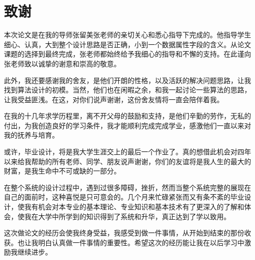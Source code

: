 \section*{致谢}
本次论文是在我的导师张留美张老师的亲切关心和悉心指导下完成的。他指导学生细心、认真，大到整个设计思路是否正确，小到一个数据属性字段的含义。从论文课题的选择到最终完成，张老师都始终给予我细心的指导和不懈的支持。在此谨向张老师致以诚挚的谢意和崇高的敬意。

此外，我还要感谢我的舍友，是他们开朗的性格，以及活跃的解决问题思路，让我找到算法设计的初模。当然，他们也在闲暇之余，和我一起讨论一些算法的思路，让我受益匪浅。在这，对你们说声谢谢，这份舍友情将一直会陪伴着我。

在我的十几年求学历程里，离不开父母的鼓励和支持，是他们辛勤的劳作，无私的付出，为我创造良好的学习条件，我才能顺利完成完成学业，感激他们一直以来对我的抚养与培育。

或许，毕业设计，将是我大学生涯交上的最后一个作业了。真的想借此机会对四年以来给我帮助的所有老师、同学、朋友说声谢谢，你们的友谊将是我人生的最大的财富，是我生命中不可或缺的一部分。

在整个系统的设计过程中，遇到过很多障碍，挫折，然而当整个系统完整的展现在自己的面前时，这种喜悦是只可意会的。几个月来忙碌紧张而又有条不紊的毕业设计，使我有机会对本专业的基本理论、专业知识和基本技术有了更深入的了解和体会，使我在大学中所学到的知识得到了系统和升华，真正达到了学以致用。

这次做论文的经历会使我终身受益，我感受到做一件事情，从开始到结束的那份收获。也让我明白认真做一件事情的重要性。希望这次的经历能让我在以后学习中激励我继续进步。
